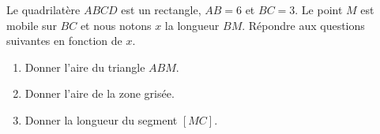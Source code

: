 
\begin{exercice}\label{exosmath-0638}

    Le quadrilatère \( ABCD\) est un rectangle, \( AB=6\) et \( BC=3\). Le point \( M\) est mobile sur \( BC\) et nous notons \( x\) la longueur \( BM\). Répondre aux questions suivantes en fonction de \( x\).
    \begin{enumerate}
        \item
            Donner l'aire du triangle \( ABM\).
        \item
            Donner l'aire de la zone grisée.
        \item
            Donner la longueur du segment \( [MC]\).
    \end{enumerate}
    
    \begin{center}
   
    \end{center}

\end{exercice}
